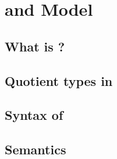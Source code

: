 \chapter{\hott and \og Model}


\section{What is \hott?}

\section{Quotient types in \hott}


\section{Syntax of \wog}


\section{Semantics}